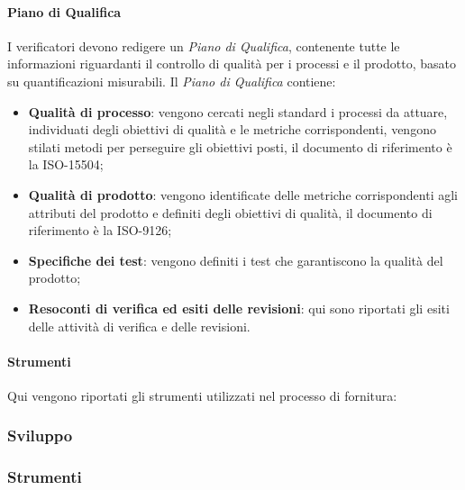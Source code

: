 			\paragraph{Piano di Qualifica}
			I verificatori devono redigere un \textit{Piano di Qualifica}, contenente tutte le informazioni riguardanti il controllo di qualità  per i processi e il prodotto, basato su quantificazioni misurabili. Il \textit{Piano di Qualifica} contiene:
			\begin{itemize}
			    \item \textbf{Qualità di processo}: vengono cercati negli standard i processi da attuare, individuati degli obiettivi di qualità e le metriche corrispondenti, vengono stilati metodi per perseguire gli obiettivi posti, il documento di riferimento è la ISO-15504;
			    \item \textbf{Qualità di prodotto}: vengono identificate delle metriche corrispondenti agli attributi del prodotto e definiti degli obiettivi di qualità, il documento di riferimento è la ISO-9126;
			    \item \textbf{Specifiche dei test}: vengono definiti i test che garantiscono la qualità del prodotto;
			    \item \textbf{Resoconti di verifica ed esiti delle revisioni}: qui sono riportati gli esiti delle attività di verifica e delle revisioni.
			\end{itemize}
			\paragraph{Strumenti}
			Qui vengono riportati gli strumenti utilizzati nel processo di fornitura:
			
		\subsubsection{Sviluppo}
		
		\subsubsection{Strumenti}
